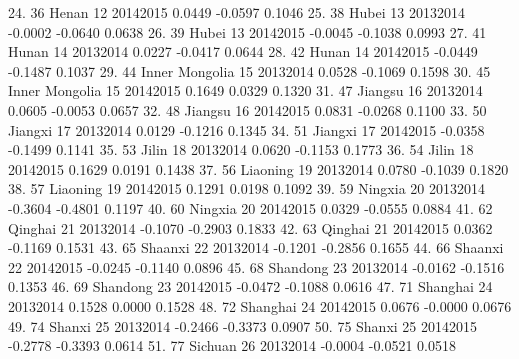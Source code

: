 24. {\VBAR}  36            Henan   12   2014{\tytilde}2015    0.0449   -0.0597   0.1046 {\VBAR}
25. {\VBAR}  38            Hubei   13   2013{\tytilde}2014   -0.0002   -0.0640   0.0638 {\VBAR}
26. {\VBAR}  39            Hubei   13   2014{\tytilde}2015   -0.0045   -0.1038   0.0993 {\VBAR}
27. {\VBAR}  41            Hunan   14   2013{\tytilde}2014    0.0227   -0.0417   0.0644 {\VBAR}
28. {\VBAR}  42            Hunan   14   2014{\tytilde}2015   -0.0449   -0.1487   0.1037 {\VBAR}
29. {\VBAR}  44   Inner Mongolia   15   2013{\tytilde}2014    0.0528   -0.1069   0.1598 {\VBAR}
30. {\VBAR}  45   Inner Mongolia   15   2014{\tytilde}2015    0.1649    0.0329   0.1320 {\VBAR}
31. {\VBAR}  47          Jiangsu   16   2013{\tytilde}2014    0.0605   -0.0053   0.0657 {\VBAR}
32. {\VBAR}  48          Jiangsu   16   2014{\tytilde}2015    0.0831   -0.0268   0.1100 {\VBAR}
33. {\VBAR}  50          Jiangxi   17   2013{\tytilde}2014    0.0129   -0.1216   0.1345 {\VBAR}
34. {\VBAR}  51          Jiangxi   17   2014{\tytilde}2015   -0.0358   -0.1499   0.1141 {\VBAR}
35. {\VBAR}  53            Jilin   18   2013{\tytilde}2014    0.0620   -0.1153   0.1773 {\VBAR}
36. {\VBAR}  54            Jilin   18   2014{\tytilde}2015    0.1629    0.0191   0.1438 {\VBAR}
37. {\VBAR}  56         Liaoning   19   2013{\tytilde}2014    0.0780   -0.1039   0.1820 {\VBAR}
38. {\VBAR}  57         Liaoning   19   2014{\tytilde}2015    0.1291    0.0198   0.1092 {\VBAR}
39. {\VBAR}  59          Ningxia   20   2013{\tytilde}2014   -0.3604   -0.4801   0.1197 {\VBAR}
40. {\VBAR}  60          Ningxia   20   2014{\tytilde}2015    0.0329   -0.0555   0.0884 {\VBAR}
41. {\VBAR}  62          Qinghai   21   2013{\tytilde}2014   -0.1070   -0.2903   0.1833 {\VBAR}
42. {\VBAR}  63          Qinghai   21   2014{\tytilde}2015    0.0362   -0.1169   0.1531 {\VBAR}
43. {\VBAR}  65          Shaanxi   22   2013{\tytilde}2014   -0.1201   -0.2856   0.1655 {\VBAR}
44. {\VBAR}  66          Shaanxi   22   2014{\tytilde}2015   -0.0245   -0.1140   0.0896 {\VBAR}
45. {\VBAR}  68         Shandong   23   2013{\tytilde}2014   -0.0162   -0.1516   0.1353 {\VBAR}
46. {\VBAR}  69         Shandong   23   2014{\tytilde}2015   -0.0472   -0.1088   0.0616 {\VBAR}
47. {\VBAR}  71         Shanghai   24   2013{\tytilde}2014    0.1528    0.0000   0.1528 {\VBAR}
48. {\VBAR}  72         Shanghai   24   2014{\tytilde}2015    0.0676   -0.0000   0.0676 {\VBAR}
49. {\VBAR}  74           Shanxi   25   2013{\tytilde}2014   -0.2466   -0.3373   0.0907 {\VBAR}
50. {\VBAR}  75           Shanxi   25   2014{\tytilde}2015   -0.2778   -0.3393   0.0614 {\VBAR}
51. {\VBAR}  77          Sichuan   26   2013{\tytilde}2014   -0.0004   -0.0521   0.0518 {\VBAR}
